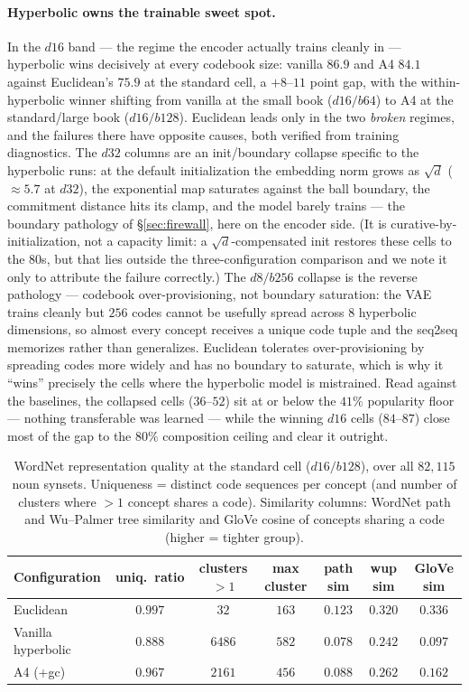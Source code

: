 \documentclass[12pt]{report}
\begin{document}
\paragraph{Hyperbolic owns the trainable sweet spot.} In the $d16$ band --- the regime the encoder actually trains cleanly in --- hyperbolic wins decisively at every codebook size: vanilla $86.9$ and A4 $84.1$ against Euclidean's $75.9$ at the standard cell, a $+8$--$11$ point gap, with the within-hyperbolic winner shifting from vanilla at the small book ($d16/b64$) to A4 at the standard/large book ($d16/b128$). Euclidean leads only in the two \emph{broken} regimes, and the failures there have opposite causes, both verified from training diagnostics. The $d32$ columns are an init/boundary collapse specific to the hyperbolic runs: at the default initialization the embedding norm grows as $\sqrt{d}$ ($\approx 5.7$ at $d32$), the exponential map saturates against the ball boundary, the commitment distance hits its clamp, and the model barely trains --- the boundary pathology of \S\ref{sec:firewall}, here on the encoder side. (It is curative-by-initialization, not a capacity limit: a $\sqrt{d}$-compensated init restores these cells to the $80$s, but that lies outside the three-configuration comparison and we note it only to attribute the failure correctly.) The $d8/b256$ collapse is the reverse pathology --- codebook over-provisioning, not boundary saturation: the VAE trains cleanly but $256$ codes cannot be usefully spread across $8$ hyperbolic dimensions, so almost every concept receives a unique code tuple and the seq2seq memorizes rather than generalizes. Euclidean tolerates over-provisioning by spreading codes more widely and has no boundary to saturate, which is why it ``wins'' precisely the cells where the hyperbolic model is mistrained. Read against the baselines, the collapsed cells ($36$--$52$) sit at or below the $41\%$ popularity floor --- nothing transferable was learned --- while the winning $d16$ cells ($84$--$87$) close most of the gap to the $80\%$ composition ceiling and clear it outright.

\begin{table}[h]
\centering
\caption{WordNet representation quality at the standard cell ($d16/b128$), over all $82{,}115$ noun synsets. Uniqueness = distinct code sequences per concept (and number of clusters where $>1$ concept shares a code). Similarity columns: WordNet path and Wu--Palmer tree similarity and GloVe cosine of concepts sharing a code (higher = tighter group).}
\label{tab:nlp_repr}
\begin{tabular}{lcccccc}
\hline
Configuration & uniq.\ ratio & clusters $>1$ & max cluster & path sim & wup sim & GloVe sim \\
\hline
Euclidean & $0.997$ & $32$ & $163$ & $0.123$ & $0.320$ & $0.336$ \\
Vanilla hyperbolic & $0.888$ & $6486$ & $582$ & $0.078$ & $0.242$ & $0.097$ \\
A4 (+gc) & $0.967$ & $2161$ & $456$ & $0.088$ & $0.262$ & $0.162$ \\
\hline
\end{tabular}
\end{table}
\end{document}

